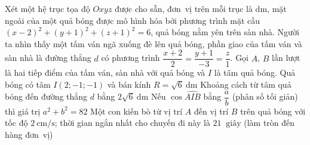 \begin{ex}%
	Xét một hệ trục tọa độ $Oxyz$ được cho sẵn, đơn~vị trên mỗi trục là $\mathrm{dm}$, mặt ngoài của một quả bóng được mô hình hóa bởi phương trình mặt cầu $(x-2)^2+(y+1)^2+(z+1)^2=6$, quả bóng nằm yên trên sàn nhà. Người ta nhìn thấy một tấm ván ngã xuống đè lên  quả bóng, phần giao của tấm ván và sàn nhà là đường thẳng $d$ có phương trình $\dfrac{x+2}{2}=\dfrac{y+1}{-3}=\dfrac{z}{1}$. Gọi $A$, $B$ lần lượt là hai tiếp điểm của tấm ván, sàn nhà với quả bóng và $I$ là tâm quả bóng.
	\choiceTF 
		{\True Quả bóng có tâm $I(2;-1;-1)$ và  bán kính $R=\sqrt{6}~\mathrm{dm}$}
		 {Khoảng cách từ tâm quả bóng đến đường thẳng $d$ bằng $2\sqrt{6}~\mathrm{dm}$}
		{\True Nếu $\cos \widehat{AIB}$ bằng $\dfrac{a}{b}$ (phân số tối giản) thì giá trị $a^2+b^2=82$} 
		{\True Một con kiến bò từ vị trí $A$ đến vị trí $B$ trên quả bóng với tốc độ $2~\mathrm{cm/s}$; thời gian ngắn nhất cho chuyến đi này là $21~\text{ giây}$ (làm tròn đến  hàng đơn~vị)}
\end{ex}
